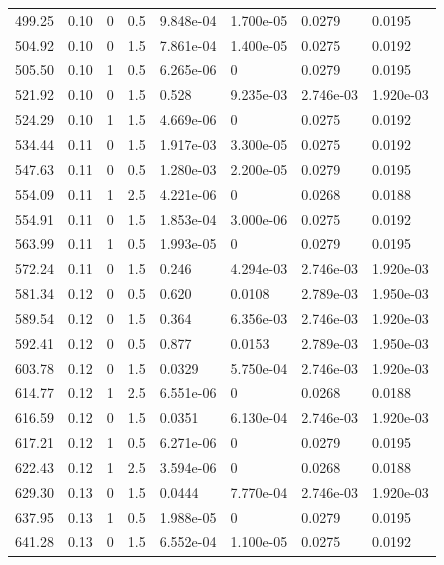 \documentclass[preview]{standalone}
\begin{document}
{{{\begin{tabular}{L{1.2cm}C{1.2cm} C{0.3cm}C{0.5cm} C{1.4cm}C{1.4cm} C{1.4cm}C{1.4cm}}
  499.25  &  0.10  & 0     & 0.5 &  9.848e-04  & 1.700e-05  & 0.0279 &  0.0195   \\ 
  504.92  &  0.10  & 0     & 1.5 &  7.861e-04  & 1.400e-05  & 0.0275 &  0.0192   \\ 
  505.50  &  0.10  & 1     & 0.5 &  6.265e-06  & 0  & 0.0279 &  0.0195   \\ 
  521.92  &  0.10  & 0     & 1.5 &  0.528  & 9.235e-03  & 2.746e-03 &  1.920e-03   \\ 
  524.29  &  0.10  & 1     & 1.5 &  4.669e-06  & 0  & 0.0275 &  0.0192   \\ 
  534.44  &  0.11  & 0     & 1.5 &  1.917e-03  & 3.300e-05  & 0.0275 &  0.0192   \\ 
  547.63  &  0.11  & 0     & 0.5 &  1.280e-03  & 2.200e-05  & 0.0279 &  0.0195   \\ 
  554.09  &  0.11  & 1     & 2.5 &  4.221e-06  & 0  & 0.0268 &  0.0188   \\ 
  554.91  &  0.11  & 0     & 1.5 &  1.853e-04  & 3.000e-06  & 0.0275 &  0.0192   \\ 
  563.99  &  0.11  & 1     & 0.5 &  1.993e-05  & 0  & 0.0279 &  0.0195   \\ 
  572.24  &  0.11  & 0     & 1.5 &  0.246  & 4.294e-03  & 2.746e-03 &  1.920e-03   \\ 
  581.34  &  0.12  & 0     & 0.5 &  0.620  & 0.0108  & 2.789e-03 &  1.950e-03   \\ 
  589.54  &  0.12  & 0     & 1.5 &  0.364  & 6.356e-03  & 2.746e-03 &  1.920e-03   \\ 
  592.41  &  0.12  & 0     & 0.5 &  0.877  & 0.0153  & 2.789e-03 &  1.950e-03   \\ 
  603.78  &  0.12  & 0     & 1.5 &  0.0329  & 5.750e-04  & 2.746e-03 &  1.920e-03   \\ 
  614.77  &  0.12  & 1     & 2.5 &  6.551e-06  & 0  & 0.0268 &  0.0188   \\ 
  616.59  &  0.12  & 0     & 1.5 &  0.0351  & 6.130e-04  & 2.746e-03 &  1.920e-03   \\ 
  617.21  &  0.12  & 1     & 0.5 &  6.271e-06  & 0  & 0.0279 &  0.0195   \\ 
  622.43  &  0.12  & 1     & 2.5 &  3.594e-06  & 0  & 0.0268 &  0.0188   \\ 
  629.30  &  0.13  & 0     & 1.5 &  0.0444  & 7.770e-04  & 2.746e-03 &  1.920e-03   \\ 
  637.95  &  0.13  & 1     & 0.5 &  1.988e-05  & 0  & 0.0279 &  0.0195   \\ 
  641.28  &  0.13  & 0     & 1.5 &  6.552e-04  & 1.100e-05  & 0.0275 &  0.0192   \\ 

\end{tabular}}}}
\end{document}
